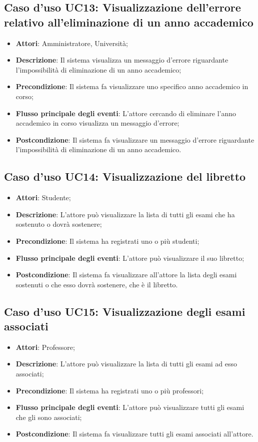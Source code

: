 \subsection{Caso d'uso \texorpdfstring{UC13}{UC13}: Visualizzazione dell'errore relativo all'eliminazione di un anno accademico}
\begin{itemize}
	\item \textbf{Attori}: Amministratore, Università;
	\item \textbf{Descrizione}: Il sistema visualizza un messaggio d'errore riguardante l'impossibilità di eliminazione di un anno accademico;
	\item \textbf{Precondizione}: Il sistema fa visualizzare uno specifico anno accademico in corso;
	\item \textbf{Flusso principale degli eventi}: L'attore cercando di eliminare l'anno accademico in corso visualizza un messaggio d'errore;
	\item \textbf{Postcondizione}: Il sistema fa visualizzare un messaggio d'errore riguardante l'impossibilità di eliminazione di un anno accademico.
	
\end{itemize}
\subsection{Caso d'uso \texorpdfstring{UC14}{UC14}: Visualizzazione del libretto}
\begin{itemize}
	\item \textbf{Attori}: Studente;
	\item \textbf{Descrizione}: L'attore può visualizzare la lista di tutti gli esami che ha sostenuto o dovrà sostenere;
	\item \textbf{Precondizione}: Il sistema ha registrati uno o più studenti;
	\item \textbf{Flusso principale degli eventi}: L'attore può visualizzare il suo libretto;
	\item \textbf{Postcondizione}: Il sistema fa visualizzare all'attore la lista degli esami sostenuti o che esso dovrà sostenere, che è il libretto.
\end{itemize}
\subsection{Caso d'uso \texorpdfstring{UC15}{UC15}: Visualizzazione degli esami associati}
\begin{itemize}
	\item \textbf{Attori}: Professore;
	\item \textbf{Descrizione}: L'attore può visualizzare la lista di tutti gli esami ad esso associati;
	\item \textbf{Precondizione}: Il sistema ha registrati uno o più professori;
	\item \textbf{Flusso principale degli eventi}: L'attore può visualizzare tutti gli esami che gli sono associati;
	\item \textbf{Postcondizione}: Il sistema fa visualizzare tutti gli esami associati all'attore.
\end{itemize}
